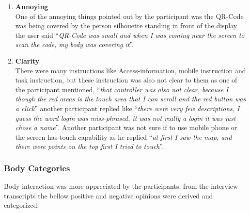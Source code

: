 \begin{enumerate}
\item	\textbf{Annoying}\\
One of the annoying things pointed out by the participant was the QR-Code was being covered by the person silhouette standing in front of the display the user said ``\emph{QR-Code was small and when I was coming near the screen to scan the code, my body was covering it}''.

\item	\textbf{Clarity}\\
There were many instructions like Access-information, mobile instruction and task instruction, but these instruction was also not clear to them as one of the participant mentioned, ``\emph{that controller was also not clear, because I though the red areas is the touch area that I can scroll and the red button was a click}'' another participant replied like ``\emph{there were very few descriptions, I guess the word login was miss-phrased, it was not really a login it was just chose a name}''. Another participant was not sure if to use mobile phone or the screen has touch capability as he replied ``\emph{at first I saw the map, and there were points on the top first I tried to touch}''.


\end{enumerate}


\subsubsection{Body Categories}
Body interaction was more appreciated by the participants; from the interview transcripts the bellow positive and negative opinions were derived and categorized.

